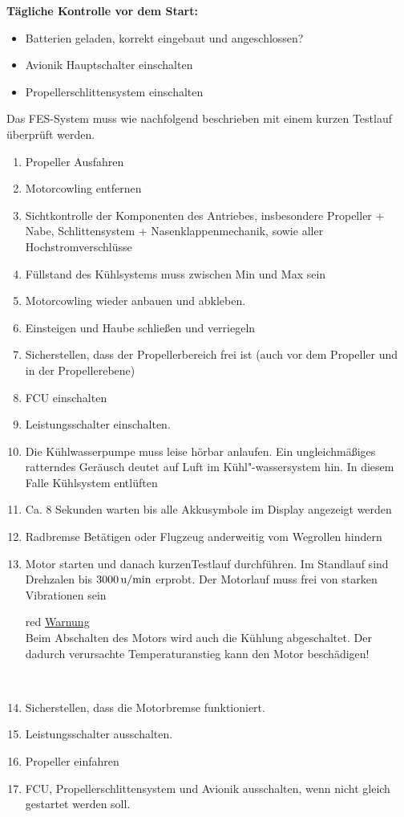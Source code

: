 \textbf{Tägliche Kontrolle vor dem Start: \\}
\begin{itemize}
\item Batterien geladen, korrekt eingebaut und angeschlossen?
\item Avionik Hauptschalter einschalten
\item Propellerschlittensystem einschalten
\end{itemize}

Das FES-System muss wie nachfolgend beschrieben mit einem kurzen Testlauf überprüft werden.\\

\begin{enumerate}

\item Propeller Ausfahren
\item	Motorcowling entfernen
\item	Sichtkontrolle der Komponenten des Antriebes, insbesondere Propeller + Nabe, Schlittensystem + Nasenklappenmechanik, sowie aller Hochstromverschlüsse
\item	 Füllstand des Kühlsystems muss zwischen Min und Max sein
\item	 Motorcowling wieder anbauen und abkleben.
\item	Einsteigen und Haube schließen und verriegeln
\item	 Sicherstellen, dass der Propellerbereich frei ist (auch vor dem Propeller und in der Propellerebene)
\item	FCU einschalten
\item	Leistungsschalter einschalten.
\item	Die Kühlwasserpumpe muss leise hörbar anlaufen. Ein ungleichmäßiges ratterndes Geräusch deutet auf Luft im Kühl"-wassersystem hin. In diesem Falle Kühlsystem entlüften
\item	Ca. 8 Sekunden warten bis alle Akkusymbole im Display angezeigt werden
\item	Radbremse Betätigen oder Flugzeug anderweitig vom Wegrollen hindern
\item	 Motor starten und danach kurzenTestlauf durchführen. Im Standlauf sind Drehzalen bis $\unit[3000]{u/min}$ erprobt. Der Motorlauf muss frei von starken Vibrationen sein

\begin{color}{red}
\large{\underline{Warnung}}\\
Beim Abschalten des Motors wird auch die Kühlung abgeschaltet. Der dadurch verursachte Temperaturanstieg kann den Motor beschädigen!
\end{color}\\

\item	Sicherstellen, dass die Motorbremse funktioniert.
\item	Leistungsschalter ausschalten.
\item	Propeller einfahren
\item	FCU, Propellerschlittensystem und Avionik ausschalten, wenn nicht gleich gestartet werden soll.
\end{enumerate}


